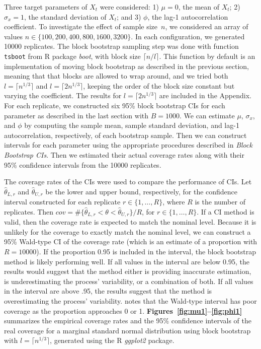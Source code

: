 \documentclass[10pt]{article}
\begin{document}
Three target parameters of $X_t$ were considered:
1) $\mu = 0$, the mean of $X_t$;
2) $\sigma_x = 1$, the standard deviation of $X_t$; and
3) $\phi$, the lag-1 autocorrelation coefficient.
To investigate the effect of sample size~$n$, we considered an array of values
$n \in \{100, 200, 400, 800, 1600, 3200\}$. In each configuration, we generated 
10000 replicates. The 
block bootstrap sampling step was done with function \texttt{tsboot} from R 
package \textsl{boot},\citep{boot} with block size $\lceil n / l \rceil$. This 
function by default is an implementation of moving block bootstrap as described 
in the previous section, meaning that that blocks are allowed to wrap around, 
and we tried both $l = \lceil n^{1/3} \rceil$ and $l = \lceil 2n^{1/3} \rceil$,
keeping the order of the block size constant but varying the coefficient. The
results for $l = \lceil 2n^{1/3} \rceil$ are included in the Appendix.
For each replicate, we constructed 
six 95\% block bootstrap 
CIs for each parameter as described in the last section with $B = 1000$. We can 
estimate $\mu$, 
$\sigma_x$, and $\phi$ by computing the sample mean, sample standard deviation, 
and lag-1 autocorrelation, respectively, of each bootstrap sample. Then we can 
construct intervals for each parameter using the appropriate procedures 
described in \textit{Block Bootstrap CIs}. 
Then we estimated their actual coverage 
rates along with their 95\% confidence intervals from the 10000 replicates. 


The coverage rates of the CIs were used to compare the performance of CIs. Let
$\hat\theta_{L, r}$ and $\hat\theta_{U, r}$ be the lower and upper bound,
respectively, for the confidence interval constructed for each replicate
$r \in \{1, \ldots, R\}$, where $R$ is the number of replicates. Then
$cov = \#\{\hat\theta_{L, r} < \theta < \hat\theta_{U, r} \}/R$, for
$r \in \{1, \ldots, R\}$. If a CI method is valid, then the coverage rate is
expected to match the nominal level. Because it is unlikely for the coverage to 
exactly match the nominal level, we can construct a 95\% Wald-type CI of the 
coverage rate 
(which is an estimate of a proportion with $R = 10000$). If the proportion 0.95 
is included in the interval, the block bootstrap method is likely performing 
well. If all values in the interval are below 0.95, the results would suggest 
that the method either is providing inaccurate estimation, is underestimating 
the process' variability, or a combination of both. If all values in the 
interval are above .95, the results suggest that the method is overestimating 
the process' variability. \citet{brown2001interval} notes that the Wald-type 
interval has poor coverage as the proportion approaches 0 or 1.
\textbf{Figures~\ref{fig:mu1}--\ref{fig:phi1}} 
summarizes the empirical coverage rates and the 95\% confidence intervals of the 
real coverage for a marginal standard normal distribution using block bootstrap
with $l = \lceil n^{1/3} \rceil$, generated using the 
R \textsl{ggplot2} package.\citep{ggplot2}
\end{document}
